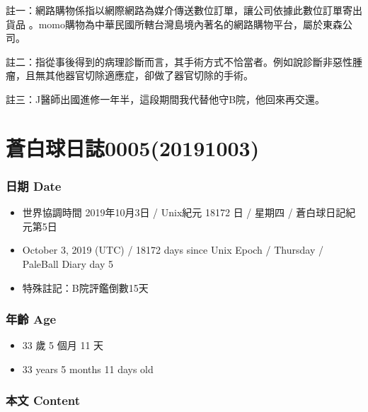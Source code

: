 \documentclass[a5paper, 12pt
]{book}
\providecommand{\tightlist}{%
  \setlength{\itemsep}{0pt}\setlength{\parskip}{0pt}}
\begin{document}
註一：網路購物係指以網際網路為媒介傳送數位訂單，讓公司依據此數位訂單寄出貨品
。momo購物為中華民國所轄台灣島境內著名的網路購物平台，屬於東森公司。

註二：指從事後得到的病理診斷而言，其手術方式不恰當者。例如說診斷非惡性腫瘤，且無其他器官切除適應症，卻做了器官切除的手術。

註三：J醫師出國進修一年半，這段期間我代替他守B院，他回來再交還。

\hypertarget{ux84bcux767dux7403ux65e5ux8a8c000520191003}{%
\section{蒼白球日誌0005(20191003)}\label{ux84bcux767dux7403ux65e5ux8a8c000520191003}}

\hypertarget{ux65e5ux671f-date-4}{%
\subsubsection{日期 Date}\label{ux65e5ux671f-date-4}}

\begin{itemize}
\tightlist
\item
  世界協調時間 2019年10月3日 / Unix紀元 18172 日 / 星期四 /
  蒼白球日記紀元第5日
\item
  October 3, 2019 (UTC) / 18172 days since Unix Epoch / Thursday /
  PaleBall Diary day 5
\item
  特殊註記：B院評鑑倒數15天
\end{itemize}

\hypertarget{ux5e74ux9f61-age-4}{%
\subsubsection{年齡 Age}\label{ux5e74ux9f61-age-4}}

\begin{itemize}
\tightlist
\item
  33 歲 5 個月 11 天
\item
  33 years 5 months 11 days old
\end{itemize}

\hypertarget{ux672cux6587-content-4}{%
\subsubsection{本文 Content}\label{ux672cux6587-content-4}}
\end{document}
